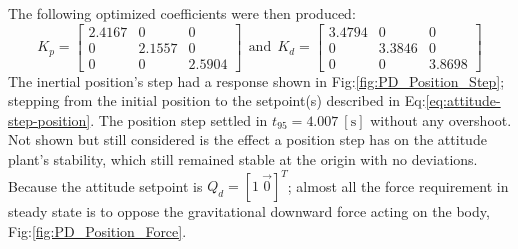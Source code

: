The following optimized coefficients were then produced:
\begin{equation}\label{eq:optimized-position-pd}
K_p = \begin{bmatrix}
2.4167 & 0 & 0\\
0 & 2.1557 & 0\\
0 & 0 & 2.5904
\end{bmatrix}
~~\text{and}~~K_d = \begin{bmatrix}
3.4794 & 0 & 0\\
0 & 3.3846 & 0\\
0 & 0 & 3.8698
\end{bmatrix}
\end{equation}
The inertial position's step had a response shown in Fig:\ref{fig:PD_Position_Step}; stepping from the initial position to the setpoint(s) described in Eq:\ref{eq:attitude-step-position}. The position step settled in $t_{95}=4.007~[\text{s}]$ without any overshoot. Not shown but still considered is the effect a position step has on the attitude plant's stability, which still remained stable at the origin with no deviations. Because the attitude setpoint is $Q_d=[1~\vec{0}]^T$; almost all the force requirement in steady state is to oppose the gravitational downward force acting on the body, Fig:\ref{fig:PD_Position_Force}.
